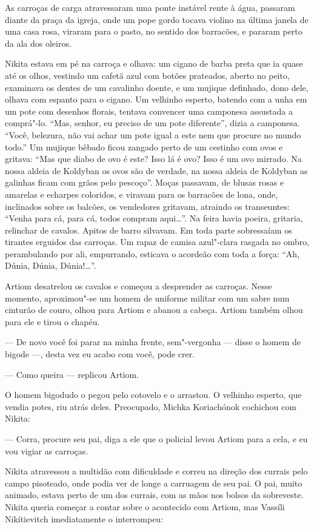 As carroças de carga atravessaram uma ponte instável rente à água,
passaram diante da praça da igreja, onde um pope gordo tocava violino na
última janela de uma casa rosa, viraram para o pasto, no sentido dos
barracões, e pararam perto da ala dos oleiros.

Nikita estava em pé na carroça e olhava: um cigano de barba preta que ia
quase até os olhos, vestindo um cafetã azul com botões prateados, aberto
no peito, examinava os dentes de um cavalinho doente, e um mujique
definhado, dono dele, olhava com espanto para o cigano. Um velhinho
esperto, batendo com a unha em um pote com desenhos florais, tentava
convencer uma camponesa assustada a comprá"-lo. ``Mas, senhor, eu preciso
de um pote diferente'', dizia a camponesa. ``Você, belezura, não vai
achar um pote igual a este nem que procure no mundo todo.'' Um mujique
bêbado ficou zangado perto de um cestinho com ovos e gritava: ``Mas que
diabo de ovo é este? Isso lá é ovo? Isso é um ovo mirrado. Na nossa
aldeia de Koldyban os ovos são de verdade, na nossa aldeia de Koldyban
as galinhas ficam com grãos pelo pescoço''. Moças passavam, de blusas
rosas e amarelas e echarpes coloridos, e viravam para os barracões de
lona, onde, inclinados sobre os balcões, os vendedores gritavam,
atraindo os transeuntes: ``Venha para cá, para cá, todos compram
aqui\ldots{}''. Na feira havia poeira, gritaria, relinchar de cavalos. Apitos
de barro silvavam. Em toda parte sobressaíam os tirantes erguidos das
carroças. Um rapaz de camisa azul"-clara rasgada no ombro, perambulando
por ali, empurrando, esticava o acordeão com toda a força: ``Ah, Dúnia,
Dúnia, Dúnia!\ldots{}''.

Artiom desatrelou os cavalos e começou a desprender as carroças. Nesse
momento, aproximou"-se um homem de uniforme militar com um sabre num
cinturão de couro, olhou para Artiom e abanou a cabeça. Artiom também
olhou para ele e tirou o chapéu.

--- De novo você foi parar na minha frente, sem"-vergonha --- disse o
homem de bigode ---, desta vez eu acabo com você, pode crer.

--- Como queira --- replicou Artiom.

O homem bigodudo o pegou pelo cotovelo e o arrastou. O velhinho esperto,
que vendia potes, riu atrás deles. Preocupado, Michka Koriachónok
cochichou com Nikita:

--- Corra, procure seu pai, diga a ele que o policial levou Artiom para
a cela, e eu vou vigiar as carroças.

Nikita atravessou a multidão com dificuldade e correu na direção dos
currais pelo campo pisoteado, onde podia ver de longe a carruagem de seu
pai. O pai, muito animado, estava perto de um dos currais, com as mãos
nos bolsos da sobreveste. Nikita queria começar a contar sobre o
acontecido com Artiom, mas Vassíli Nikítievitch imediatamente o
interrompeu:

